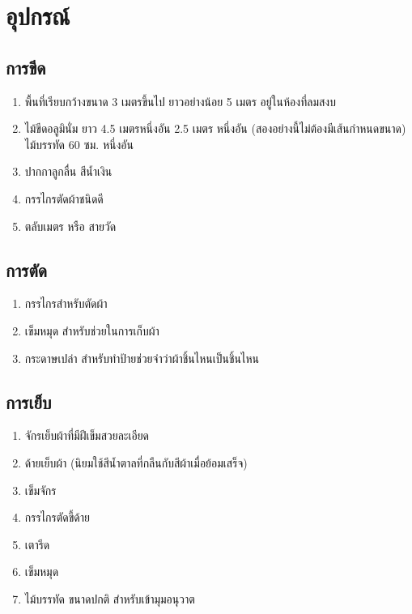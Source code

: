 \chapter{อุปกรณ์}

\section{การขีด}

\begin{enumerate}
\def\labelenumi{(\arabic{enumi})}
\item
  พื้นที่เรียบกว้างขนาด 3 เมตรขึ้นไป ยาวอย่างน้อย 5 เมตร
  อยู่ในห้องที่ลมสงบ
\item
  ไม้ขีดอลูมินั่ม ยาว 4.5 เมตรหนึ่งอัน 2.5 เมตร หนึ่งอัน
  (สองอย่างนี้ไม่ต้องมีเส้นกำหนดขนาด) ไม้บรรทัด 60 ซม. หนึ่งอัน
\item
  ปากกาลูกลื่น สีน้ำเงิน
\item
  กรรไกรตัดผ้าชนิดดี
\item
  ตลับเมตร หรือ สายวัด
\end{enumerate}

\section{การตัด}

\begin{enumerate}
\def\labelenumi{(\arabic{enumi})}
\item
  กรรไกรสำหรับตัดผ้า
\item
  เข็มหมุด สำหรับช่วยในการเก็บผ้า
\item
  กระดาษเปล่า สำหรับทำป้ายช่วยจำว่าผ้าชิ้นไหนเป็นชิ้นไหน
\end{enumerate}

\section{การเย็บ}

\begin{enumerate}
\def\labelenumi{(\arabic{enumi})}
\item
  จักรเย็บผ้าที่มีฝีเข็มสวยละเอียด
\item
  ด้ายเย็บผ้า (นิยมใช้สีน้ำตาลที่กลืนกับสีผ้าเมื่อย้อมเสร็จ)
\item
  เข็มจักร
\item
  กรรไกรตัดขี้ด้าย
\item
  เตารีด
\item
  เข็มหมุด
\item
  ไม้บรรทัด ขนาดปกติ สำหรับเข้ามุมอนุวาต
\end{enumerate}

